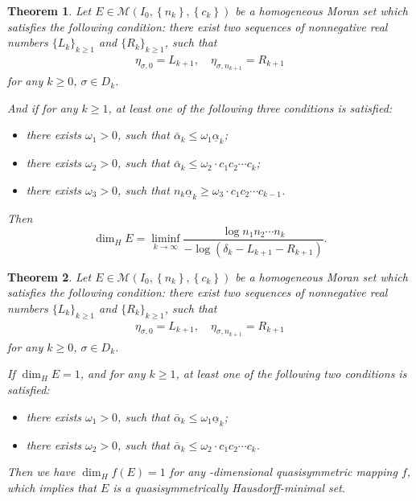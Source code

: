 \documentclass[10pt,a4paper]{amsart}
\newtheorem{thm}{Theorem}
\begin{document}
\begin{thm}\label{thm}
    Let
	$E\in \mathcal{M}(I_{0},\left\{n_{k}\right\},\left\{c_{k}\right\})$ be a homogeneous Moran set which satisfies the following condition:
there exist two sequences of nonnegative real numbers $\{L_k\}_{k\ge1}$ and $\{R_k\}_{k\ge 1}$, such that
\begin{equation}
 \begin{aligned}
    \eta_{\sigma,0}=L_{k+1},\quad
    \eta_{\sigma,n_{k+1}}=R_{k+1} \nonumber
 \end{aligned}
 \end{equation}
 for any $k\ge 0$, $\sigma\in D_{k}$.

And if for any $k\ge 1$, at least one of the following three conditions is satisfied:
\begin{itemize}
  \item[(A)]there exists $\omega_1>0$, such that $\bar\alpha_k\le \omega_1 \underline\alpha_k$;
  \item[(B)]there exists $\omega_2>0$, such that $\bar\alpha_k\le \omega_2\cdot c_1c_2\cdots c_k$;
  \item[(C)]there exists $\omega_3>0$, such that $n_k\underline\alpha_k\ge \omega_3\cdot c_1c_2\cdots c_{k-1}$.
\end{itemize}

Then
\begin{equation}\label{311}
\dim_HE=\liminf\limits_{k \to\infty}  \frac{\log n_1n_2\cdots n_k}{-\log(\delta_k-L_{k+1}-R_{k+1})}.
\end{equation}
\end{thm}

\begin{thm}\label{thm2}
	    Let
	$E\in \mathcal{M}(I_{0},\left\{n_{k}\right\},\left\{c_{k}\right\})$ be a homogeneous Moran set which satisfies the following condition:
there exist two sequences of nonnegative real numbers $\{L_k\}_{k\ge1}$ and $\{R_k\}_{k\ge 1}$, such that
\begin{equation}
 \begin{aligned}
    \eta_{\sigma,0}=L_{k+1},\quad
    \eta_{\sigma,n_{k+1}}=R_{k+1} \nonumber
 \end{aligned}
 \end{equation}
 for any $k\ge 0$, $\sigma\in D_{k}$.

If $\dim_{H}E=1$, and for any $k\ge 1$, at least one of the following two conditions is satisfied:
\begin{itemize}
  \item[(A)]there exists $\omega_1>0$, such that $\bar\alpha_k\le \omega_1 \underline\alpha_k$;
  \item[(B)]there exists $\omega_2>0$, such that $\bar\alpha_k\le \omega_2\cdot c_1c_2\cdots c_k$.
\end{itemize}

Then we have $\operatorname{dim}_{H}f(E)=1$ for any -dimensional quasisymmetric mapping $f$, which implies that $E$ is a quasisymmetrically  Hausdorff-minimal set.

\end{thm}
\end{document}
